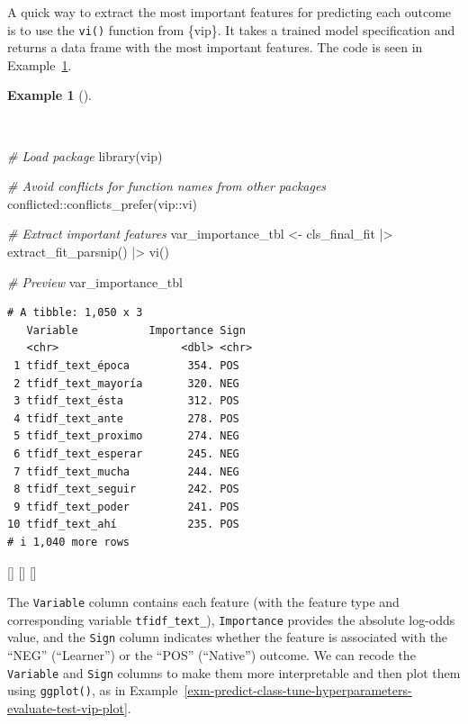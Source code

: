 \documentclass[
  letterpaper,
  krantz1]{latex/krantz-mod}
\newenvironment{Shaded}{\begin{snugshade}}{\end{snugshade}}
\newcommand{\CommentTok}[1]{\textcolor[rgb]{0.00,0.00,0.00}{\textit{#1}}}
\newcommand{\FunctionTok}[1]{\textcolor[rgb]{0.00,0.00,0.00}{#1}}
\newcommand{\NormalTok}[1]{\textcolor[rgb]{0.00,0.00,0.00}{#1}}
\newcommand{\OtherTok}[1]{\textcolor[rgb]{0.00,0.00,0.00}{#1}}
\newcommand{\SpecialCharTok}[1]{\textcolor[rgb]{0.00,0.00,0.00}{#1}}
\newcommand{\cindex}[1]{%
  \StrSubstitute{#1}{_}{\_}[\temp]%
  \index{\temp}%
}
\theoremstyle{definition}
\theoremstyle{definition}
\newtheorem{example}{Example}[chapter]
\theoremstyle{remark}
\begin{document}
A quick way to extract the most important features for predicting each
outcome is to use the \texttt{vi()} function from
\{vip\}. It takes a trained model
specification and returns a data frame with the most important features.
The code is seen in
Example~\ref{exm-predict-class-tune-hyperparameters-evaluate-test-vip}.

\begin{example}[]\protect\hypertarget{exm-predict-class-tune-hyperparameters-evaluate-test-vip}{}\label{exm-predict-class-tune-hyperparameters-evaluate-test-vip}

~

\begin{Shaded}
\begin{Highlighting}[numbers=left,,]
\CommentTok{\# Load package}
\FunctionTok{library}\NormalTok{(vip)}

\CommentTok{\# Avoid conflicts for function names from other packages}
\NormalTok{conflicted}\SpecialCharTok{::}\FunctionTok{conflicts\_prefer}\NormalTok{(vip}\SpecialCharTok{::}\NormalTok{vi)}

\CommentTok{\# Extract important features}
\NormalTok{var\_importance\_tbl }\OtherTok{\textless{}{-}}
\NormalTok{  cls\_final\_fit }\SpecialCharTok{|\textgreater{}}
  \FunctionTok{extract\_fit\_parsnip}\NormalTok{() }\SpecialCharTok{|\textgreater{}}
  \FunctionTok{vi}\NormalTok{()}

\CommentTok{\# Preview}
\NormalTok{var\_importance\_tbl}
\end{Highlighting}
\end{Shaded}

\begin{verbatim}
# A tibble: 1,050 x 3
   Variable           Importance Sign 
   <chr>                   <dbl> <chr>
 1 tfidf_text_época         354. POS  
 2 tfidf_text_mayoría       320. NEG  
 3 tfidf_text_ésta          312. POS  
 4 tfidf_text_ante          278. POS  
 5 tfidf_text_proximo       274. NEG  
 6 tfidf_text_esperar       245. NEG  
 7 tfidf_text_mucha         244. NEG  
 8 tfidf_text_seguir        242. POS  
 9 tfidf_text_poder         241. POS  
10 tfidf_text_ahí           235. POS  
# i 1,040 more rows
\end{verbatim}

\cindex{vi()}\cindex{extract_fit_parsnip()}\cindex{library()}

\end{example}

The \texttt{Variable} column contains each feature (with the feature
type and corresponding variable \texttt{tfidf\_text\_}),
\texttt{Importance} provides the absolute log-odds value, and the
\texttt{Sign} column indicates whether the feature is associated with
the ``NEG'' (``Learner'') or the ``POS'' (``Native'') outcome. We can
recode the \texttt{Variable} and \texttt{Sign} columns to make them more
interpretable and then plot them using \texttt{ggplot()}, as in
Example~\ref{exm-predict-class-tune-hyperparameters-evaluate-test-vip-plot}.
\end{document}
